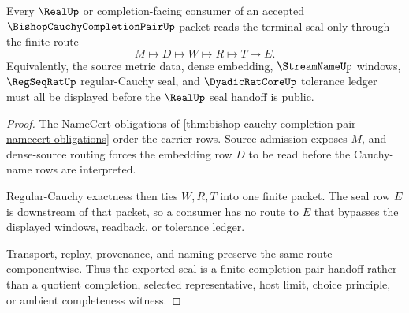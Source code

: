 \begin{theorem}
\label{thm:bishop-cauchy-completion-pair-routed-seal}
Every $\RealUp$ or completion-facing consumer of an accepted $\BishopCauchyCompletionPairUp$ packet reads the terminal seal only through the finite route
$$
M \longmapsto D \longmapsto W \longmapsto R \longmapsto T \longmapsto E.
$$
Equivalently, the source metric data, dense embedding, $\StreamNameUp$ windows, $\RegSeqRatUp$ regular-Cauchy seal, and $\DyadicRatCoreUp$ tolerance ledger must all be displayed before the $\RealUp$ seal handoff is public.
\end{theorem}
\begin{proof}
The NameCert obligations of \autoref{thm:bishop-cauchy-completion-pair-namecert-obligations} order the carrier rows. Source admission exposes $M$, and dense-source routing forces the embedding row $D$ to be read before the Cauchy-name rows are interpreted.

Regular-Cauchy exactness then ties $W,R,T$ into one finite packet. The seal row $E$ is downstream of that packet, so a consumer has no route to $E$ that bypasses the displayed windows, readback, or tolerance ledger.

Transport, replay, provenance, and naming preserve the same route componentwise. Thus the exported seal is a finite completion-pair handoff rather than a quotient completion, selected representative, host limit, choice principle, or ambient completeness witness.
\end{proof}




